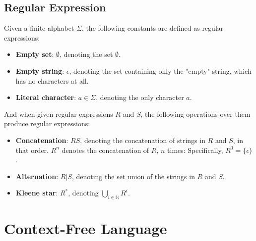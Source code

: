 \documentclass{report}
\begin{document}
		\subsection{Regular Expression}
			\begin{defn} \label{def_RE}
				Given a finite alphabet $\Sigma$, the following constants are defined as regular expressions:
				\begin{itemize}
					\item \textbf{Empty set}: $\emptyset$, denoting the set $\emptyset$.
					\item \textbf{Empty string}: $\epsilon$, denoting the set containing only the "empty" string, which has no characters at all.
					\item \textbf{Literal character}: $a \in \Sigma$, denoting the only character $a$.
				\end{itemize}
				And when given regular expressions $R$ and $S$, the following operations over them produce regular expressions:
				\begin{itemize}
					\item \textbf{Concatenation}: $RS$, denoting the concatenation of strings in $R$ and $S$, in that order.
						\subitem $R^n$ denotes the concatenation of $R$, $n$ times: Specifically, $R^0=\{\epsilon\}$.
					\item \textbf{Alternation}: $R|S$, denoting the set union of the strings in $R$ and $S$.
					\item \textbf{Kleene star}: $R^*$, denoting $\bigcup_{i \in \mathbb{N}}R^i$.
				\end{itemize}
			\end{defn}
			
			\begin{defn} \label{def_RL}
				
			\end{defn}
			
			\begin{thm} \label{thm_pumping_lemma_RL}
				
			\end{thm}
	
	\section{Context-Free Language}
\end{document}
